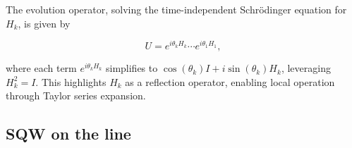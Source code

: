 \documentclass[../../main.tex]{subfiles}
\begin{document}
The evolution operator, solving the
time-independent Schrödinger equation for $H_k$, is given by

\begin{equation}
	U = e^{i\theta_{k}H_{k}}\cdots e^{i\theta_{1}H_{1}},
\end{equation}

where each term $e^{i\theta_{k}H_{k}}$ simplifies to $\cos(\theta_k)I +
i\sin(\theta_k)H_k$, leveraging $H_k^2 = I$. This highlights $H_k$ as a
reflection operator, enabling local operation through Taylor series expansion.

%

\subsection{SQW on the line}
\end{document}
